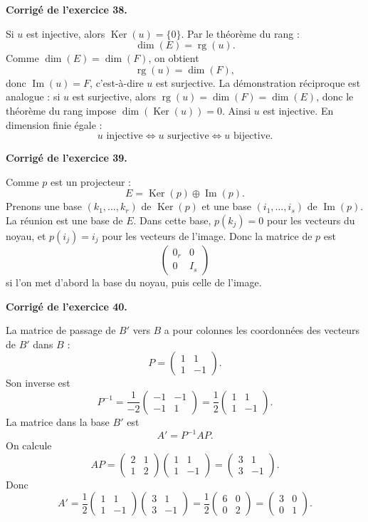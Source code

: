 \documentclass[11pt,a4paper]{article}
\newcommand{\corr}[1]{
    \vspace{0.35cm}
    \noindent\textbf{\textcolor{blue!60!black}{Corrigé de l'exercice #1.}}
    \par
}
\newcommand{\Ker}{\operatorname{Ker}}
\newcommand{\Img}{\operatorname{Im}}
\newcommand{\rg}{\operatorname{rg}}
\begin{document}
\corr{38}
Si $u$ est injective, alors $\Ker(u)=\{0\}$. Par le théorème du rang :
\[
\dim(E)=\rg(u).
\]
Comme $\dim(E)=\dim(F)$, on obtient
\[
\rg(u)=\dim(F),
\]
donc $\Img(u)=F$, c'est-à-dire $u$ est surjective.
La démonstration réciproque est analogue : si $u$ est surjective, alors $\rg(u)=\dim(F)=\dim(E)$, donc le théorème du rang impose $\dim(\Ker(u))=0$. Ainsi $u$ est injective.
En dimension finie égale :
\[
u\text{ injective}\Longleftrightarrow u\text{ surjective}\Longleftrightarrow u\text{ bijective}.
\]

\corr{39}
Comme $p$ est un projecteur :
\[
E=\Ker(p)\oplus\Img(p).
\]
Prenons une base $(k_1,\dots,k_r)$ de $\Ker(p)$ et une base $(i_1,\dots,i_s)$ de $\Img(p)$. La réunion est une base de $E$.
Dans cette base, $p(k_j)=0$ pour les vecteurs du noyau, et $p(i_j)=i_j$ pour les vecteurs de l'image. Donc la matrice de $p$ est
\[
\begin{pmatrix}
0_r&0\\
0&I_s
\end{pmatrix}
\]
si l'on met d'abord la base du noyau, puis celle de l'image.

\corr{40}
La matrice de passage de $B'$ vers $B$ a pour colonnes les coordonnées des vecteurs de $B'$ dans $B$ :
\[
P=
\begin{pmatrix}
1&1\\
1&-1
\end{pmatrix}.
\]
Son inverse est
\[
P^{-1}=\frac{1}{-2}
\begin{pmatrix}
-1&-1\\
-1&1
\end{pmatrix}
=
\frac12
\begin{pmatrix}
1&1\\
1&-1
\end{pmatrix}.
\]
La matrice dans la base $B'$ est
\[
A'=P^{-1}AP.
\]
On calcule
\[
AP=
\begin{pmatrix}
2&1\\
1&2
\end{pmatrix}
\begin{pmatrix}
1&1\\
1&-1
\end{pmatrix}
=
\begin{pmatrix}
3&1\\
3&-1
\end{pmatrix}.
\]
Donc
\[
A'=\frac12
\begin{pmatrix}
1&1\\
1&-1
\end{pmatrix}
\begin{pmatrix}
3&1\\
3&-1
\end{pmatrix}
=
\frac12
\begin{pmatrix}
6&0\\
0&2
\end{pmatrix}
=
\begin{pmatrix}
3&0\\
0&1
\end{pmatrix}.
\]
\end{document}
